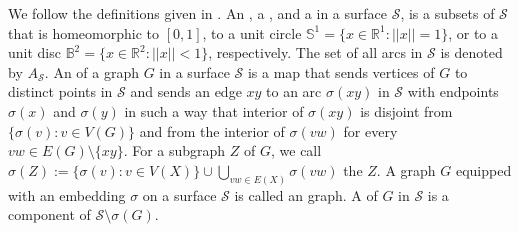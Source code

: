 We follow the definitions given in \citet[Appendix~B]{diestel:graph}. An , a , and a  in a surface $\mathcal{S}$, is a subsets of $\mathcal{S}$ that is homeomorphic to $[0, 1]$, to a unit circle $\mathbb{S}^1 = \{x \in \mathbb{R}^1: ||x|| = 1\}$, or to a unit disc $\mathbb{B}^2 = \{x \in \mathbb{R}^2 : ||x|| < 1\}$, respectively. 
The set of all arcs in $\mathcal{S}$ is denoted by $A_\mathcal{S}$. 
An  of a graph $G$ in a surface $\mathcal{S}$ is a map  that sends vertices of $G$ to distinct points in $\mathcal{S}$ and sends an edge $xy$ to 
an arc $\sigma(xy)$ in $\mathcal{S}$ with endpoints $\sigma(x)$ and $\sigma(y)$ in such a way that interior of $\sigma(xy)$ is disjoint from $\{\sigma(v):v\in V(G)\}$ and from the interior of $\sigma(vw)$ for every $vw\in E(G)\setminus\{xy\}$.  For a subgraph $Z$ of $G$, we call $\sigma(Z):=\{\sigma(v):v\in V(X)\}\cup \bigcup_{vw\in E(X)}\sigma(vw)$ the  $Z$.
A graph $G$ equipped with an embedding $\sigma$ on a surface $\mathcal{S}$ is called an  graph. A  of $G$ in $\mathcal{S}$ is a component of $\mathcal{S} \setminus \sigma(G)$.  



